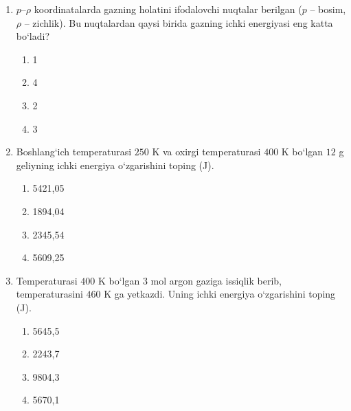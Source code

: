 \begin{enumerate}
\begin{enumerate}[label=\Alph*)]
\end{enumerate}

\item $p$–$\rho$ koordinatalarda gazning holatini ifodalovchi nuqtalar berilgan ($p$ – bosim, $\rho$ – zichlik). Bu nuqtalardan qaysi birida gazning ichki energiyasi eng katta bo‘ladi?


\begin{enumerate}[label=\Alph*)]
\item 1
\item 4
\item 2
\item 3

\end{enumerate}

\item Boshlang‘ich temperaturasi $250$ K va oxirgi temperaturasi $400$ K bo‘lgan $12$ g geliyning ichki energiya o‘zgarishini toping (J).
\begin{enumerate}[label=\Alph*)]
\item 5421,05
\item 1894,04
\item 2345,54
\item 5609,25

\end{enumerate}

\item Temperaturasi $400$ K bo‘lgan $3$ mol argon gaziga issiqlik berib, temperaturasini $460$ K ga yetkazdi. Uning ichki energiya o‘zgarishini toping (J).
\begin{enumerate}[label=\Alph*)]
\item 5645,5
\item 2243,7
\item 9804,3
\item 5670,1

\end{enumerate}


\end{enumerate}
